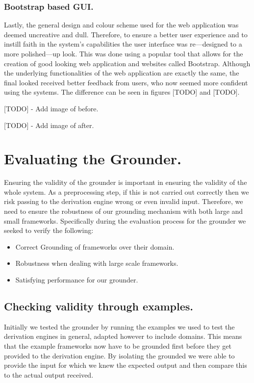 \subsubsection{Bootstrap based GUI.}
Lastly, the general design and colour scheme used for the web application was deemed uncreative and dull. Therefore, to ensure a better user experience and to instill faith in the system's capabilities the user interface was re---designed to a more polished---up look. This was done using a popular tool that allows for the creation of good looking web application and websites called Bootstrap. Although the underlying functionalities of the web application are exactly the same, the final looked received better feedback from users, who now seemed more confident using the systems. The difference can be seen in figures [TODO] and [TODO].

[TODO] - Add image of before.

[TODO] - Add image of after.

\section{Evaluating the Grounder.}
Ensuring the validity of the grounder is important in ensuring the validity of the whole system. As a preprocessing step, if this is not carried out correctly then we risk passing to the derivation engine wrong or even invalid input. Therefore, we need to ensure the robustness of our grounding mechanism with both large and small frameworks. Specifically during the evaluation process for the grounder we seeked to verify the following:

\begin{itemize}
\item Correct Grounding of frameworks over their domain.
\item Robustness when dealing with large scale frameworks.
\item Satisfying performance for our grounder.
\end{itemize}

\subsection{Checking validity through examples.}
Initially we tested the grounder by running the examples we used to test the derivation engines in general, adapted however to include domains. This means that the example frameworks now have to be grounded first before they get provided to the derivation engine. By isolating the grounded we were able to provide the input for which we knew the expected output and then compare this to the actual output received. 

